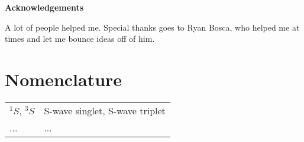 \documentclass[12pt,openany]{book}
\def\biblio{}
\begin{document}
\def\biblio{}



{} %





\clearpage
\thispagestyle{plain}
\begin{center}
    \large
    \textbf{Acknowledgements}
\end{center}
A lot of people helped me. Special thanks goes to Ryan Bosca, who helped me at times and let me bounce ideas off of him.


\hypersetup{linktocpage}
\hypersetup{
    colorlinks,
    citecolor=black,
    filecolor=black,
    linkcolor=black,
    urlcolor=black
}

\tableofcontents
\newpage
\listoffigures
\listoftables
\newpage
{}


\clearpage
\chapter*{Nomenclature}
\label{chp:nomenclature}
\begin{table*}
	\begin{tabular}{l l}
$^1S$, $^3S$ & S-wave singlet, S-wave triplet  \\
... & ...                \\
	\end{tabular}
\end{table*}
\end{document}

